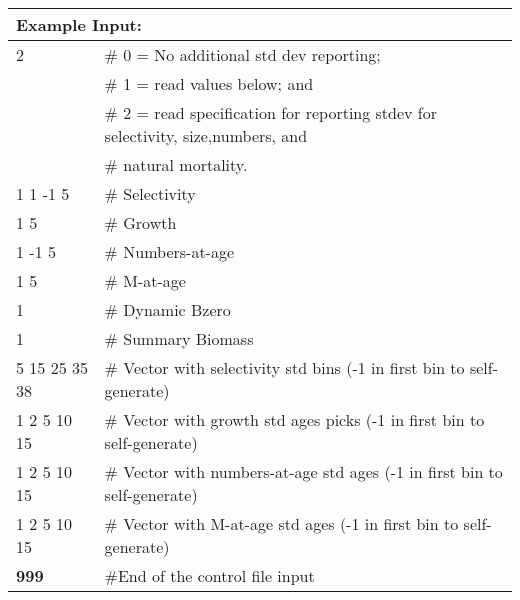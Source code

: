 \begin{longtable}{p{1.1cm} p{1.4cm} p{1.2cm} p{1.2cm} p{1.3cm} p{1.6cm} p{1.4cm} p{1.4cm} p{1.4cm}}
	
	\hline
	\multicolumn{9}{l}{Example Input:} \Tstrut\Bstrut\\
	\hline
	
	\multicolumn{3}{l}{2} & \multicolumn{6}{l}{\# 0 = No additional std dev reporting;} \Tstrut\\
	\multicolumn{3}{l}{ } & \multicolumn{6}{l}{\# 1 = read values below; and} \Bstrut\\
	\multicolumn{3}{l}{ } & \multicolumn{6}{l}{\# 2 = read specification for reporting stdev for selectivity, size,numbers, and} \Bstrut\\
	\multicolumn{3}{l}{ } & \multicolumn{6}{l}{\# natural mortality.} \Bstrut\\
	\hline
	
	\multicolumn{4}{l}{1 1 -1 5}  & \multicolumn{5}{l}{\# Selectivity} \Bstrut\\
	\multicolumn{4}{l}{1 5}       & \multicolumn{5}{l}{\# Growth} \Bstrut\\
	\multicolumn{4}{l}{1 -1 5}    & \multicolumn{5}{l}{\# Numbers-at-age} \Bstrut\\
	\multicolumn{4}{l}{1 5}       & \multicolumn{5}{l}{\# M-at-age} \Bstrut\\
	\multicolumn{4}{l}{1}         & \multicolumn{5}{l}{\# Dynamic Bzero} \Bstrut\\
	\multicolumn{4}{l}{1}         & \multicolumn{5}{l}{\# Summary Biomass} \Bstrut\\
	
	\multicolumn{4}{l}{5 15 25 35 38} & \multicolumn{5}{l}{\# Vector with selectivity std bins (-1 in first bin to self-generate)} \Bstrut\\
	\multicolumn{4}{l}{1 2 5 10 15}  & \multicolumn{5}{l}{\# Vector with growth std ages picks (-1 in first bin to self-generate)} \Bstrut\\
	\multicolumn{4}{l}{1 2 5 10 15}  & \multicolumn{5}{l}{\# Vector with numbers-at-age std ages (-1 in first bin to self-generate)} \Bstrut\\
	\multicolumn{4}{l}{1 2 5 10 15}  & \multicolumn{5}{l}{\# Vector with M-at-age std ages (-1 in first bin to self-generate)} \Bstrut\\
	
	\hline
	\bfseries{999} & \multicolumn{8}{l}{\#End of the control file input} \Tstrut\Bstrut\\
	\hline			
\end{longtable}
